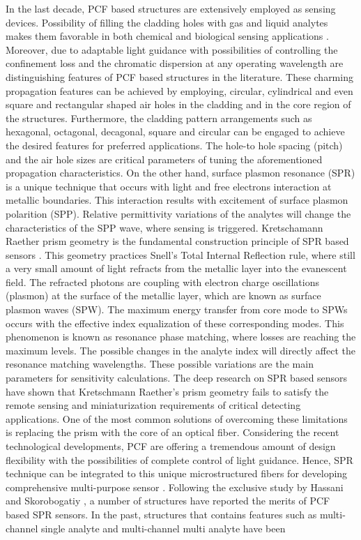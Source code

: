 \documentclass[journal]{IEEEtran}
\begin{document}
In the last decade, PCF based structures are extensively employed as sensing devices. Possibility of filling the cladding holes with gas and liquid analytes makes them favorable in both chemical and biological sensing applications  \cite{wang2011selectively,rifat2016highly,caucheteur2015review,dash2014spr}. Moreover, due to adaptable light guidance with possibilities of controlling the confinement loss and the chromatic dispersion at any operating wavelength are distinguishing features of PCF based structures in the literature. These charming propagation features can be achieved by employing, circular, cylindrical and even square and rectangular shaped \cite{wang2015simulation} air holes in the cladding and in the core region of the structures. Furthermore, the cladding pattern arrangements such as hexagonal, octagonal, decagonal, square and circular \cite{wang2011selectively,bouk2004dispersion,ademgil2014highly,razzak2007chromatic} can be engaged to achieve the desired features for preferred applications. The hole-to hole spacing (pitch) and the air hole sizes are critical parameters of tuning the aforementioned propagation characteristics. On the other hand, surface plasmon resonance (SPR) is a unique technique that occurs with light and free electrons interaction at metallic boundaries. This interaction results with excitement of surface plasmon polarition (SPP). Relative permittivity variations of the analytes will change the characteristics of the SPP wave, where sensing is triggered. Kretschamann Raether prism geometry is the fundamental construction principle of SPR based sensors  \cite{kretschmann1968radiative}. This geometry practices Snell's Total Internal Reflection rule, where still a very small amount of light refracts from the metallic layer into the evanescent field. The refracted photons are coupling with electron charge oscillations (plasmon) at the surface of the metallic layer, which are known as surface plasmon waves (SPW). The maximum energy transfer from core mode to SPWs occurs with the effective index equalization of these corresponding modes. This phenomenon is known as resonance phase matching, where losses are reaching the maximum levels. The possible changes in the analyte index will directly affect the resonance matching wavelengths. These possible variations are the main parameters for sensitivity calculations. The deep research on SPR based sensors have shown that Kretschmann Raether's prism geometry fails to satisfy the remote sensing and miniaturization requirements of critical detecting applications. One of the most common solutions of overcoming these limitations is replacing the prism with the core of an optical fiber. Considering the recent technological developments, PCF are offering a tremendous amount of design flexibility with the possibilities of complete control of light guidance. Hence, SPR technique can be integrated to this unique microstructured fibers for developing comprehensive multi-purpose sensor \cite{rifat2016highly,yasli2019effect}. Following the exclusive study by Hassani and Skorobogatiy \cite{hassani2006design}, a number of structures have reported the merits of PCF based SPR sensors. In the past, structures that contains features such as multi-channel single analyte and multi-channel multi analyte have been 
\end{document}
